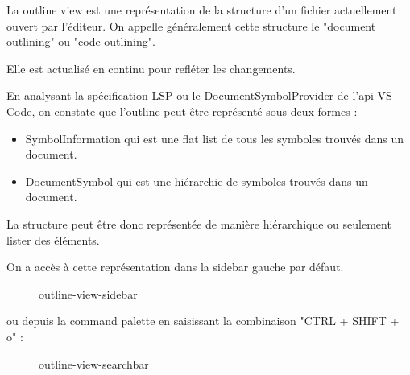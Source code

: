 \documentclass[
    iict, %
    il, %
]{heig-tb}
\begin{document}
La outline view est une représentation de la structure d'un fichier actuellement ouvert par l'éditeur. On appelle généralement cette structure le "document outlining" ou "code outlining".

Elle est actualisé en continu pour refléter les changements.

En analysant la spécification \href{https://microsoft.github.io/language-server-protocol/specifications/lsp/3.17/specification/}{LSP} ou le \href{https://code.visualstudio.com/api/references/vscode-api#DocumentSymbol}{DocumentSymbolProvider} de l'api VS Code, on constate que l'outline peut être représenté sous deux formes :

\begin{itemize}
    \item SymbolInformation qui est une flat list de tous les symboles trouvés dans un document.
    \item DocumentSymbol qui est une hiérarchie de symboles trouvés dans un document.
\end{itemize}

La structure peut être donc représentée de manière hiérarchique ou seulement lister des éléments.

On a accès à cette représentation dans la sidebar gauche par défaut.

\begin{figure}[!h]
    \begin{center}
    \end{center}
    \caption[Outline view disponible depuis la sidebar]{\label{outline-view-sidebar} outline-view-sidebar}
\end{figure}

ou depuis la command palette en saisissant la combinaison "CTRL + SHIFT + o" :

\begin{figure}[!h]
    \begin{center}
    \end{center}
    \caption[Outline view disponible depuis la searchbar]{\label{outline-view-searchbar} outline-view-searchbar}
\end{figure}
\end{document}
